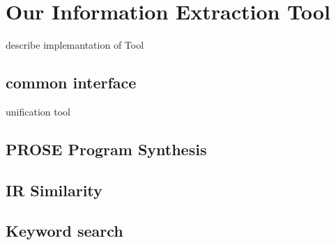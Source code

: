 \documentclass[\myrootdir/main.tex]{subfiles}
\begin{document}
\chapter{Our Information Extraction Tool}
\label{implementation}
describe implemantation of Tool

\section{common interface} 
unification tool

\section{PROSE Program Synthesis}

\section{IR Similarity}

\section{Keyword search}
\end{document}
